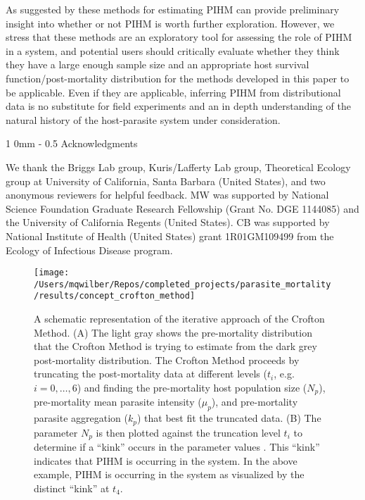 \documentclass[12pt, a4paper]{article}
\makeatletter
\renewcommand{\section}{\@startsection
{section}%
{1}%
{0mm}%
{-\baselineskip}%
{0.5\baselineskip}%
{\normalfont\bf\large}} %
\makeatother
\begin{document}
As suggested by \cite{Lester1984} these methods for estimating PIHM can
provide preliminary insight into whether or not PIHM is worth further
exploration.  However, we stress that these methods are an
exploratory tool for assessing the role of PIHM in a system, and potential
users should critically evaluate whether they think they have a large enough
sample size and an appropriate host survival function/post-mortality distribution for the methods developed
in this paper to be applicable.  Even if they are applicable, inferring PIHM
from distributional data is no substitute for field experiments
and an in depth understanding of the natural history of the host-parasite
system under consideration.

\section{Acknowledgments}

We thank the Briggs Lab group, Kuris/Lafferty Lab group, Theoretical Ecology group at University of California, Santa Barbara (United States), and two anonymous reviewers for helpful feedback.  MW was supported by National Science Foundation Graduate Research Fellowship (Grant No. DGE 1144085) and the University of California Regents (United States). CB was supported by National Institute of Health (United States) grant 1R01GM109499 from the Ecology of Infectious Disease program.



% 
% 


\clearpage


\begin{figure}
    \texttt{[image: /Users/mqwilber/Repos/completed\_projects/parasite\_mortality/results/concept\_crofton\_method]}
    \caption{A schematic representation of the iterative approach of the Crofton Method. (A) The light gray shows the pre-mortality distribution that the Crofton Method is trying to estimate from the dark grey post-mortality distribution.  The Crofton Method proceeds by truncating the post-mortality data at different levels ($t_i$, e.g. $i= 0, \dots, 6$) and finding the pre-mortality host population size ($N_p$), pre-mortality mean parasite intensity ($\mu_p$), and pre-mortality parasite aggregation ($k_p$) that best fit the truncated data. (B) The parameter $N_p$ is then plotted against the truncation level $t_i$ to determine if a ``kink'' occurs in the parameter values  \citep{Lester1984}. This ``kink'' indicates that PIHM is occurring in the system. In the above example, PIHM is occurring in the system as visualized by the distinct ``kink'' at $t_4$.}
\end{figure}
\end{document}
